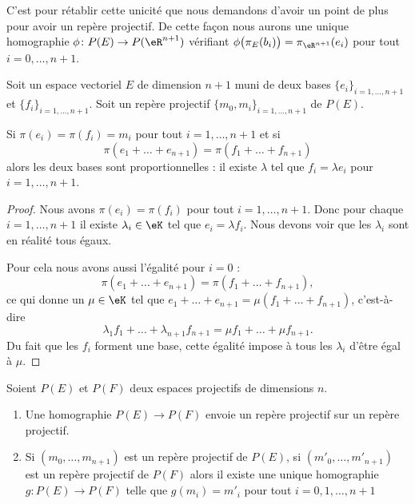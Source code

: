C'est pour rétablir cette unicité que nous demandons d'avoir un point de plus pour avoir un repère projectif. De cette façon nous aurons une unique homographie \( \phi\colon P(E)\to P(\eR^{n+1})\) vérifiant \( \phi\big( \pi_E(b_i) \big)=\pi_{\eR^{n+1}}(e_i)\) pour tout \( i=0,\ldots, n+1\).

\begin{lemma}
    Soit un espace vectoriel \( E\) de dimension \( n+1\) muni de deux bases \( \{ e_i \}_{i=1,\ldots, n+1}\) et \( \{ f_i \}_{i=1,\ldots, n+1}\). Soit un repère projectif \( \{ m_0,m_i \}_{i=1,\ldots, n+1}  \) de \( P(E)\).

    Si \( \pi(e_i)=\pi(f_i)=m_i\) pour tout \( i=1,\ldots, n+1\) et si
    \begin{equation}
        \pi(e_1+\ldots +e_{n+1})=\pi(f_1+\ldots +f_{n+1})
    \end{equation}
    alors les deux bases sont proportionnelles : il existe \( \lambda\) tel que \( f_i=\lambda e_i\) pour \( i=1,\ldots, n+1\).
\end{lemma}

\begin{proof}
    Nous avons \( \pi(e_i)=\pi(f_i)\) pour tout \( i=1,\ldots, n+1\). Donc pour chaque $i=1,\ldots, n+1$ il existe \( \lambda_i\in \eK\) tel que \( e_i=\lambda f_i\). Nous devons voir que les \( \lambda_i\) sont en réalité tous égaux.

    Pour cela nous avons aussi l'égalité pour \( i=0\) :
    \begin{equation}
        \pi(e_1+\ldots +e_{n+1})=\pi(f_1+\ldots +f_{n+1}),
    \end{equation}
    ce qui donne un \( \mu\in \eK\) tel que $e_1+\ldots +e_{n+1}=\mu(f_1+\ldots +f_{n+1})$, c'est-à-dire
    \begin{equation}
        \lambda_1 f_1+\ldots +\lambda_{n+1}f_{n+1}=\mu f_1+\ldots +\mu f_{n+1}.
    \end{equation}
    Du fait que les \( f_i\) forment une base, cette égalité impose à tous les \( \lambda_i\) d'être égal à \( \mu\).
\end{proof}

\begin{theorem}     \label{THOooTXPVooJGigne}
    Soient \( P(E)\) et \( P(F)\) deux espaces projectifs de dimensions \( n\).
    \begin{enumerate}
        \item       \label{ITEMooRSIWooXbEnlT}
            Une homographie \( P(E)\to P(F)\) envoie un repère projectif sur un repère projectif.
        \item       \label{ITEMooQXQXooDyIsxsh}
            Si \( (m_0,\ldots, m_{n+1})\) est un repère projectif de \( P(E)\), si \( (m'_0,\ldots, m'_{n+1})\) est un repère projectif de \( P(F)\) alors il existe une unique homographie \( g\colon P(E)\to P(F)\) telle que \( g(m_i)=m'_i\) pour tout \( i=0,1,\ldots, n+1\)
    \end{enumerate}
\end{theorem}

